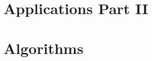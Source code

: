 \documentclass[12pt,reqno]{report}
\theoremstyle{definition}
\numberwithin{equation}{section}
\begin{document}


\part{Applications Part II}







\part{Algorithms}




% 
% 
\printbibliography

\appendix


\end{document}
